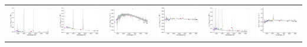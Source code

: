 \begin{center}
\begin{longtable}{l l l l l l }
    \includegraphics[width=0.3\linewidth, clip]{Figs/Figs-sdss/spec-2568-54153-0481-SPLUS-n01s27-050095.pdf} & \includegraphics[width=0.3\linewidth, clip]{Figs/Figs-sdss/spec-2636-54082-0584-STRIPE82-0054-038222.pdf} & \includegraphics[width=0.3\linewidth, clip]{Figs/Figs-sdss/spec-2892-54552-0550-SPLUS-n01s24-037959.pdf} & \includegraphics[width=0.3\linewidth, clip]{Figs/Figs-sdss/spec-3587-55182-0140-STRIPE82-0015-024713.pdf} & \includegraphics[width=0.3\linewidth, clip]{Figs/Figs-sdss/spec-3588-55184-0604-STRIPE82-0016-029684.pdf} & \includegraphics[width=0.3\linewidth, clip]{Figs/Figs-sdss/spec-3589-55186-0260-STRIPE82-0017-024243.pdf} \\

\end{longtable}
\end{center}
